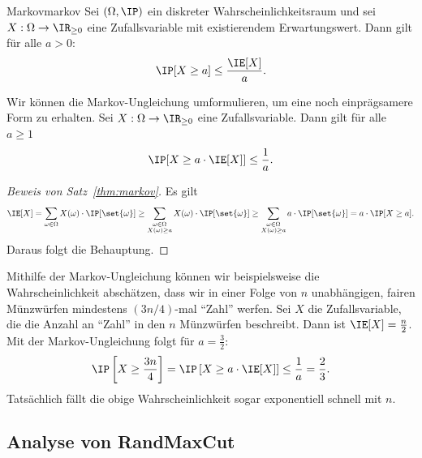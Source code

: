 \documentclass[language=ngerman,algolist]{TemplateLecture}
\begin{document}
\begin{thm}{Markov}{markov}
    Sei $(\Omega, \IP)$ ein diskreter Wahrscheinlichkeitsraum und sei $X: \Omega \to \IR_{\geq 0}$ eine Zufallsvariable mit existierendem Erwartungswert. Dann gilt für alle $a > 0$:
    \begin{equation*}
        \IP[X \geq a] \leq \frac{\IE[X]}{a}.
    \end{equation*}
\end{thm}
Wir können die Markov-Ungleichung umformulieren, um eine noch einprägsamere Form zu erhalten. Sei $X: \Omega \to \IR_{\geq 0}$ eine Zufallsvariable. Dann gilt für alle $a \geq 1$
\begin{equation*}
    \IP[X \geq a \cdot \IE[X]] \leq \frac{1}{a}.
\end{equation*}
\begin{proof}[Beweis von Satz~\ref{thm:markov}]
    Es gilt 
    \begin{equation*}
        \IE[X] = \sum_{\omega \in \Omega} X(\omega) \cdot \IP[\set{\omega}] \geq \sum_{\substack{\omega \in \Omega \\ X(\omega) \geq a}} X(\omega) \cdot \IP[\set{\omega}] \geq \sum_{\substack{\omega \in \Omega \\ X(\omega) \geq a}} a \cdot \IP[\set{\omega}] = a \cdot \IP[X \geq a].
    \end{equation*}
    Daraus folgt die Behauptung.
\end{proof}
Mithilfe der Markov-Ungleichung können wir beispielsweise die Wahrscheinlichkeit abschätzen, dass wir in einer Folge von $n$ unabhängigen, fairen Münzwürfen mindestens $(3n/4)$-mal \enquote{Zahl} werfen. Sei $X$ die Zufallsvariable, die die Anzahl an \enquote{Zahl} in den $n$ Münzwürfen beschreibt. Dann ist $\IE[X] = \frac{n}{2}$. Mit der Markov-Ungleichung folgt für $a = \frac{3}{2}$:
\begin{equation*}
    \IP\left[X \geq \frac{3n}{4}\right] = \IP\left[X \geq a \cdot \IE[X]\right] \leq \frac{1}{a} = \frac{2}{3}.
\end{equation*}
Tatsächlich fällt die obige Wahrscheinlichkeit sogar exponentiell schnell mit $n$.

\subsection{Analyse von RandMaxCut}
\end{document}
